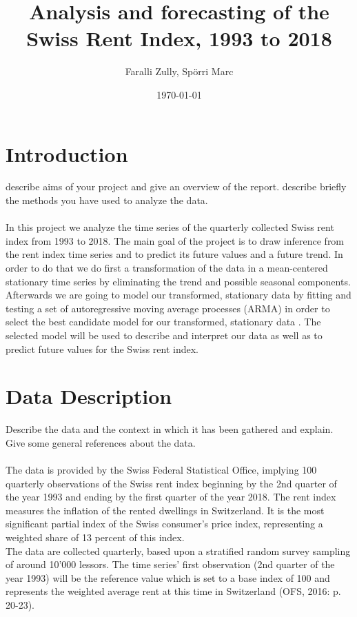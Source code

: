 \documentclass[11pt,a4paper]{article}
\author{Faralli Zully, Spörri Marc} \title{Analysis and forecasting of the Swiss Rent Index, 1993 to 2018} \date{\today}
\begin{document}
\maketitle
\pagebreak
\tableofcontents
\pagebreak

\section{Introduction}
describe aims of your project and give an overview of the report. describe briefly the methods you have used to analyze the data.
\\
\\
In this project we analyze the time series of the quarterly collected Swiss rent index from 1993 to 2018. The main goal of the project is to draw inference from the rent index time series and to predict its
future values and a future trend. In order to do that we do first a transformation of the data in a mean-centered
stationary time series by eliminating the trend and possible seasonal components. Afterwards we are going to model our transformed, stationary data by fitting and testing a set of autoregressive moving average processes (ARMA) in order to select the best candidate model for our transformed, stationary data \cite[p.~82--110]{bd02}. The selected model will be used to describe and interpret our data as well as to predict future values for the Swiss rent index.

\section{Data Description}
Describe the data and the context in which it has been gathered and explain. Give some general references about the data.
\\
\\
The data is provided by the Swiss Federal Statistical Office, implying 100 quarterly observations of the Swiss rent index beginning by the 2nd quarter of the year 1993 and ending by the first quarter of the year 2018. The rent index measures the inflation of the rented dwellings in Switzerland. It is the most significant partial index of the Swiss consumer’s price index, representing a weighted share of 13 percent of this index. \\
The data are collected quarterly, based upon a stratified random survey sampling of around 10'000 lessors. The time series' first observation (2nd quarter of the year 1993) will be the reference value which is set to a base index of 100 and represents the weighted average rent at this time in Switzerland (OFS, 2016: p. 20-23).
\end{document}
